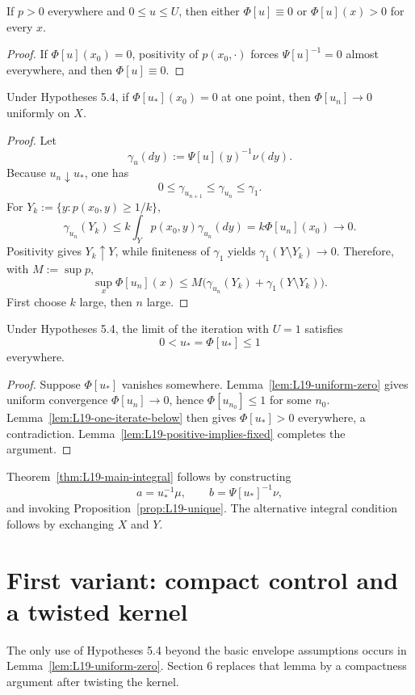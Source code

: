 \begin{lemma}\label{lem:L19-dichotomy}
If $p>0$ everywhere and $0\le u\le U$, then either $\Phi[u]\equiv0$ or $\Phi[u](x)>0$ for every $x$.
\end{lemma}
\begin{proof}
If $\Phi[u](x_0)=0$, positivity of $p(x_0,\cdot)$ forces $\Psi[u]^{-1}=0$ almost everywhere, and then $\Phi[u]\equiv0$.
\end{proof}

\begin{lemma}\label{lem:L19-uniform-zero}
Under Hypotheses 5.4, if $\Phi[u_*](x_0)=0$ at one point, then $\Phi[u_n]\to0$ uniformly on $X$.
\end{lemma}
\begin{proof}
Let
\[
 \gamma_u(dy):=\Psi[u](y)^{-1}\nu(dy).
\]
Because $u_n\downarrow u_*$, one has
\[
 0\le\gamma_{u_{n+1}}\le\gamma_{u_n}\le\gamma_1.
\]
For $Y_k:=\{y:p(x_0,y)\ge1/k\}$,
\[
 \gamma_{u_n}(Y_k)
 \le k\int_Yp(x_0,y)\gamma_{u_n}(dy)
 =k\Phi[u_n](x_0)\longrightarrow0.
\]
Positivity gives $Y_k\uparrow Y$, while finiteness of $\gamma_1$ yields $\gamma_1(Y\setminus Y_k)\to0$.  Therefore, with $M:=\sup p$,
\[
 \sup_x\Phi[u_n](x)
 \le M\bigl(\gamma_{u_n}(Y_k)+\gamma_1(Y\setminus Y_k)\bigr).
\]
First choose $k$ large, then $n$ large.
\end{proof}

\begin{theorem}\label{thm:L19-fortet-existence}
Under Hypotheses 5.4, the limit of the iteration with $U=1$ satisfies
\[
 0<u_*=\Phi[u_*]\le1
\]
everywhere.
\end{theorem}
\begin{proof}
Suppose $\Phi[u_*]$ vanishes somewhere.  Lemma~\ref{lem:L19-uniform-zero} gives uniform convergence $\Phi[u_n]\to0$, hence $\Phi[u_{n_0}]\le1$ for some $n_0$.  Lemma~\ref{lem:L19-one-iterate-below} then gives $\Phi[u_*]>0$ everywhere, a contradiction.  Lemma~\ref{lem:L19-positive-implies-fixed} completes the argument.
\end{proof}

Theorem~\ref{thm:L19-main-integral} follows by constructing
\[
 a=u_*^{-1}\mu,
 \qquad
 b=\Psi[u_*]^{-1}\nu,
\]
and invoking Proposition~\ref{prop:L19-unique}.  The alternative integral condition follows by exchanging $X$ and $Y$.

\section{First variant: compact control and a twisted kernel}
The only use of Hypotheses 5.4 beyond the basic envelope assumptions occurs in Lemma~\ref{lem:L19-uniform-zero}.  Section 6 replaces that lemma by a compactness argument after twisting the kernel.

